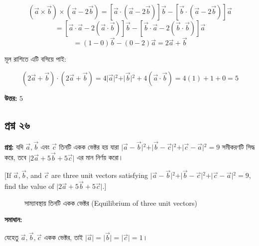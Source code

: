 \documentclass{article}
\begin{document}
$$(\vec{a} \times \vec{b}) \times (\vec{a} - 2\vec{b}) = [\vec{a} \cdot (\vec{a} - 2\vec{b})]\vec{b} - [\vec{b} \cdot (\vec{a} - 2\vec{b})]\vec{a}$$
$$= [\vec{a} \cdot \vec{a} - 2(\vec{a} \cdot \vec{b})]\vec{b} - [\vec{b} \cdot \vec{a} - 2(\vec{b} \cdot \vec{b})]\vec{a}$$
$$= (1 - 0)\vec{b} - (0 - 2)\vec{a} = 2\vec{a} + \vec{b}$$

মূল রাশিতে এটি বসিয়ে পাই:

$$(2\vec{a} + \vec{b}) \cdot (2\vec{a} + \vec{b}) = 4\vert{}\vec{a}\vert{}^2 + \vert{}\vec{b}\vert{}^2 + 4(\vec{a} \cdot \vec{b}) = 4(1) + 1 + 0 = 5$$

\textbf{উত্তর:} $5$

\hrulefill

\subsection*{প্রশ্ন ২৬}
\textbf{প্রশ্ন:} যদি $\vec{a}, \vec{b}$ এবং $\vec{c}$ তিনটি একক ভেক্টর হয় যারা $\vert{}\vec{a} - \vec{b}\vert{}^2 + \vert{}\vec{b} - \vec{c}\vert{}^2 + \vert{}\vec{c} - \vec{a}\vert{}^2 = 9$ সমীকরণটি সিদ্ধ করে, তবে $\vert{}2\vec{a} + 5\vec{b} + 5\vec{c}\vert{}$ এর মান নির্ণয় করো।

[If $\vec{a}, \vec{b}$, and $\vec{c}$ are three unit vectors satisfying $\vert{}\vec{a} - \vec{b}\vert{}^2 + \vert{}\vec{b} - \vec{c}\vert{}^2 + \vert{}\vec{c} - \vec{a}\vert{}^2 = 9$, find the value of $\vert{}2\vec{a} + 5\vec{b} + 5\vec{c}\vert{}$.]

\begin{figure}[h!]
\centering
{}
\caption{সাম্যাবস্থায় তিনটি একক ভেক্টর (Equilibrium of three unit vectors)}
\end{figure}

\textbf{সমাধান:}

যেহেতু $\vec{a}, \vec{b}, \vec{c}$ একক ভেক্টর, তাই $\vert{}\vec{a}\vert{} = \vert{}\vec{b}\vert{} = \vert{}\vec{c}\vert{} = 1$।
\end{document}
